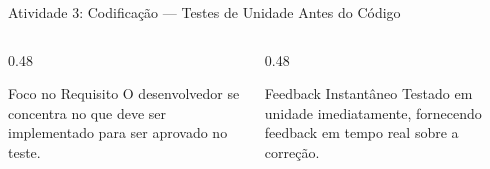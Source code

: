 \documentclass[aspectratio=169, 9pt]{beamer}
\begin{document}
\begin{frame}{Atividade 3: Codificação --- Testes de Unidade Antes do Código}
  \vspace{-0.1cm}

  \begin{columns}[T]
    \begin{column}{0.48\textwidth}
      \begin{exampleblock}{Foco no Requisito}
        O desenvolvedor se concentra no que deve ser implementado para ser aprovado no teste.
      \end{exampleblock}
    \end{column}

    \begin{column}{0.48\textwidth}
      \begin{alertblock}{Feedback Instantâneo}
        Testado em unidade imediatamente, fornecendo feedback em tempo real sobre a correção.
      \end{alertblock}
    \end{column}
  \end{columns}
\end{frame}
\end{document}
